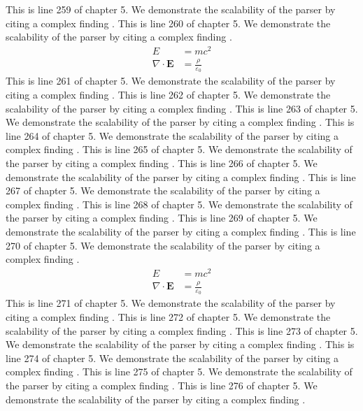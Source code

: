 This is line 259 of chapter 5. We demonstrate the scalability of the parser by citing a complex finding \cite{ref5_259}.
This is line 260 of chapter 5. We demonstrate the scalability of the parser by citing a complex finding \cite{ref5_260}.
\begin{align*}
  E &= mc^2 \\
  \nabla \cdot \mathbf{E} &= \frac{\rho}{\varepsilon_0}
\end{align*}
This is line 261 of chapter 5. We demonstrate the scalability of the parser by citing a complex finding \cite{ref5_261}.
This is line 262 of chapter 5. We demonstrate the scalability of the parser by citing a complex finding \cite{ref5_262}.
This is line 263 of chapter 5. We demonstrate the scalability of the parser by citing a complex finding \cite{ref5_263}.
This is line 264 of chapter 5. We demonstrate the scalability of the parser by citing a complex finding \cite{ref5_264}.
This is line 265 of chapter 5. We demonstrate the scalability of the parser by citing a complex finding \cite{ref5_265}.
This is line 266 of chapter 5. We demonstrate the scalability of the parser by citing a complex finding \cite{ref5_266}.
This is line 267 of chapter 5. We demonstrate the scalability of the parser by citing a complex finding \cite{ref5_267}.
This is line 268 of chapter 5. We demonstrate the scalability of the parser by citing a complex finding \cite{ref5_268}.
This is line 269 of chapter 5. We demonstrate the scalability of the parser by citing a complex finding \cite{ref5_269}.
This is line 270 of chapter 5. We demonstrate the scalability of the parser by citing a complex finding \cite{ref5_270}.
\begin{align*}
  E &= mc^2 \\
  \nabla \cdot \mathbf{E} &= \frac{\rho}{\varepsilon_0}
\end{align*}
This is line 271 of chapter 5. We demonstrate the scalability of the parser by citing a complex finding \cite{ref5_271}.
This is line 272 of chapter 5. We demonstrate the scalability of the parser by citing a complex finding \cite{ref5_272}.
This is line 273 of chapter 5. We demonstrate the scalability of the parser by citing a complex finding \cite{ref5_273}.
This is line 274 of chapter 5. We demonstrate the scalability of the parser by citing a complex finding \cite{ref5_274}.
This is line 275 of chapter 5. We demonstrate the scalability of the parser by citing a complex finding \cite{ref5_275}.
This is line 276 of chapter 5. We demonstrate the scalability of the parser by citing a complex finding \cite{ref5_276}.
